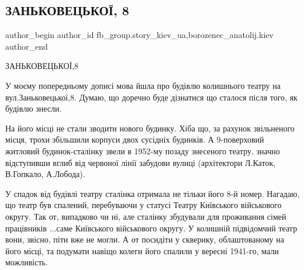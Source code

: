  
 
 
 
 
 
\subsection{ЗАНЬКОВЕЦЬКОЇ, 8}
\label{sec:09_10_2021.fb.fb_group.story_kiev_ua.1.zanjkoveckoj_8}
 
\ifcmt
 author_begin
   author_id fb_group.story_kiev_ua,borozenec_anatolij.kiev
 author_end
\fi

ЗАНЬКОВЕЦЬКОЇ,8

У моєму попередньому дописі мова йшла про будівлю колишнього театру на
вул.Заньковецької,8. Думаю, що доречно буде дізнатися що сталося після того, як
будівлю знесли. 

На його місці не стали зводити нового будинку. Хіба що, за рахунок звільненого
місця, трохи збільшили корпуси двох сусідніх будинків. А 9-поверховий житловий
будинок-сталінку звели в 1952-му позаду знесеного театру, значно відступивши
вглиб від червоної лінії забудови вулиці (архітектори Л.Каток, В.Гопкало,
А.Лобода). 

У спадок від будівлі театру сталінка отримала не тільки його 8-й номер.
Нагадаю, що театр був спалений, перебуваючи   у статусі Театру Київського
військового округу. Так от, випадково чи ні, але сталінку збудували для
проживання сімей працівників ...саме Київського військового округу. У колишній
підвідомчий театр вони, звісно, піти вже не могли. А от посидіти у скверику,
облаштованому на його місці, та подумати навіщо колеги його спалили у вересні
1941-го, мали можливість.   

\begin{multicols}{2}
\end{multicols}


